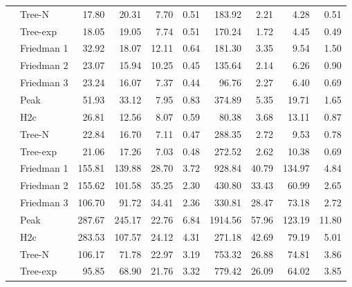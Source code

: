 \begin{table}[t]
{\begin{tabular}[t]{rlrrrrrrrr}
 & Tree-N & 17.80 & 20.31 & 7.70 & 0.51 & 183.92 & 2.21 & 4.28 & 0.51\\

\multirow[t]{-7}{*}{\raggedleft\arraybackslash 500} & Tree-exp & 18.05 & 19.05 & 7.74 & 0.51 & 170.24 & 1.72 & 4.45 & 0.49\\
\cmidrule{1-10}
 & Friedman 1 & 32.92 & 18.07 & 12.11 & 0.64 & 181.30 & 3.35 & 9.54 & 1.50\\

 & Friedman 2 & 23.07 & 15.94 & 10.25 & 0.45 & 135.64 & 2.14 & 6.26 & 0.90\\

 & Friedman 3 & 23.24 & 16.07 & 7.37 & 0.44 & 96.76 & 2.27 & 6.40 & 0.69\\

 & Peak & 51.93 & 33.12 & 7.95 & 0.83 & 374.89 & 5.35 & 19.71 & 1.65\\

 & H2c & 26.81 & 12.56 & 8.07 & 0.59 & 80.38 & 3.68 & 13.11 & 0.87\\

 & Tree-N & 22.84 & 16.70 & 7.11 & 0.47 & 288.35 & 2.72 & 9.53 & 0.78\\

\multirow[t]{-7}{*}{\raggedleft\arraybackslash 1000} & Tree-exp & 21.06 & 17.26 & 7.03 & 0.48 & 272.52 & 2.62 & 10.38 & 0.69\\
\cmidrule{1-10}
 & Friedman 1 & 155.81 & 139.88 & 28.70 & 3.72 & 928.84 & 40.79 & 134.97 & 4.84\\

 & Friedman 2 & 155.62 & 101.58 & 35.25 & 2.30 & 430.80 & 33.43 & 60.99 & 2.65\\

 & Friedman 3 & 106.70 & 91.72 & 34.41 & 2.36 & 330.81 & 28.47 & 73.18 & 2.72\\

 & Peak & 287.67 & 245.17 & 22.76 & 6.84 & 1914.56 & 57.96 & 123.19 & 11.80\\

 & H2c & 283.53 & 107.57 & 24.12 & 4.31 & 271.18 & 42.69 & 79.19 & 5.01\\

 & Tree-N & 106.17 & 71.78 & 22.97 & 3.19 & 753.32 & 26.88 & 74.81 & 3.86\\

\multirow[t]{-7}{*}{\raggedleft\arraybackslash 5000} & Tree-exp & 95.85 & 68.90 & 21.76 & 3.32 & 779.42 & 26.09 & 64.02 & 3.85\\
\bottomrule
\end{tabular}}
\end{table}


